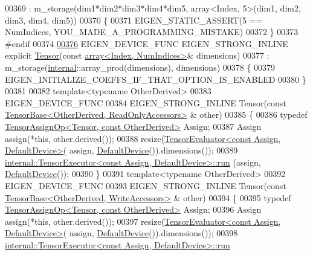 \begin{DoxyCode}
00369       : m\_storage(dim1*dim2*dim3*dim4*dim5, array<Index, 5>(dim1, dim2, dim3, dim4, dim5))
00370     \{
00371       EIGEN\_STATIC\_ASSERT(5 == NumIndices, YOU\_MADE\_A\_PROGRAMMING\_MISTAKE)
00372     \}
00373 \textcolor{preprocessor}{#endif}
00374 
\hyperlink{class_eigen_1_1_tensor_a6ef6b578cd0ca367842b0d8888e22195}{00376}     EIGEN\_DEVICE\_FUNC EIGEN\_STRONG\_INLINE \textcolor{keyword}{explicit} \hyperlink{class_eigen_1_1_tensor_a6ef6b578cd0ca367842b0d8888e22195}{Tensor}(\textcolor{keyword}{const} 
      \hyperlink{class_eigen_1_1array}{array<Index, NumIndices>}& dimensions)
00377         : m\_storage(\hyperlink{namespaceinternal}{internal}::array\_prod(dimensions), dimensions)
00378     \{
00379       EIGEN\_INITIALIZE\_COEFFS\_IF\_THAT\_OPTION\_IS\_ENABLED
00380     \}
00381 
00382     \textcolor{keyword}{template}<\textcolor{keyword}{typename} OtherDerived>
00383     EIGEN\_DEVICE\_FUNC
00384     EIGEN\_STRONG\_INLINE Tensor(\textcolor{keyword}{const} \hyperlink{class_eigen_1_1_tensor_base}{TensorBase<OtherDerived, ReadOnlyAccessors>}
      & other)
00385     \{
00386       \textcolor{keyword}{typedef} \hyperlink{class_eigen_1_1_tensor_assign_op}{TensorAssignOp<Tensor, const OtherDerived>} Assign;
00387       Assign assign(*\textcolor{keyword}{this}, other.derived());
00388       resize(\hyperlink{struct_eigen_1_1_tensor_evaluator}{TensorEvaluator<const Assign, DefaultDevice>}(
      assign, \hyperlink{struct_eigen_1_1_default_device}{DefaultDevice}()).dimensions());
00389       \hyperlink{class_eigen_1_1internal_1_1_tensor_executor}{internal::TensorExecutor<const Assign, DefaultDevice>::run}
      (assign, \hyperlink{struct_eigen_1_1_default_device}{DefaultDevice}());
00390     \}
00391     \textcolor{keyword}{template}<\textcolor{keyword}{typename} OtherDerived>
00392     EIGEN\_DEVICE\_FUNC
00393     EIGEN\_STRONG\_INLINE Tensor(\textcolor{keyword}{const} \hyperlink{class_eigen_1_1_tensor_base}{TensorBase<OtherDerived, WriteAccessors>}
      & other)
00394     \{
00395       \textcolor{keyword}{typedef} \hyperlink{class_eigen_1_1_tensor_assign_op}{TensorAssignOp<Tensor, const OtherDerived>} Assign;
00396       Assign assign(*\textcolor{keyword}{this}, other.derived());
00397       resize(\hyperlink{struct_eigen_1_1_tensor_evaluator}{TensorEvaluator<const Assign, DefaultDevice>}(
      assign, \hyperlink{struct_eigen_1_1_default_device}{DefaultDevice}()).dimensions());
00398       \hyperlink{class_eigen_1_1internal_1_1_tensor_executor}{internal::TensorExecutor<const Assign, DefaultDevice>::run}

\end{DoxyCode}
